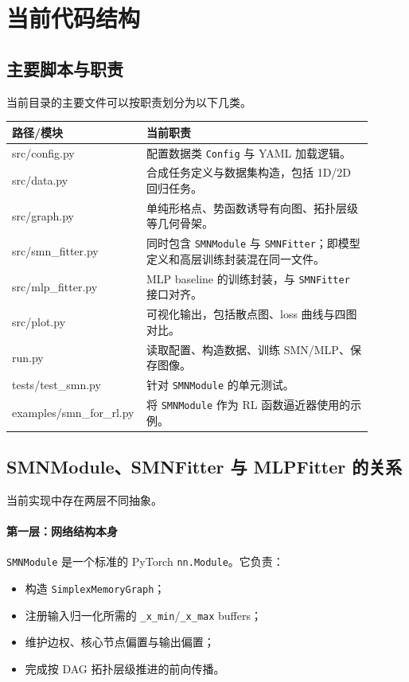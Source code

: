 \documentclass[11pt,fontset=none]{ctexart}
\begin{document}
\section{当前代码结构}

\subsection{主要脚本与职责}

当前目录的主要文件可以按职责划分为以下几类。

\begin{center}
\begin{tabular}{>{\ttfamily}p{0.28\linewidth} p{0.62\linewidth}}
\toprule
路径/模块 & 当前职责 \\
\midrule
src/config.py & 配置数据类 \texttt{Config} 与 YAML 加载逻辑。 \\
src/data.py & 合成任务定义与数据集构造，包括 1D/2D 回归任务。 \\
src/graph.py & 单纯形格点、势函数诱导有向图、拓扑层级等几何骨架。 \\
src/smn\_fitter.py & 同时包含 \texttt{SMNModule} 与 \texttt{SMNFitter}；即模型定义和高层训练封装混在同一文件。 \\
src/mlp\_fitter.py & MLP baseline 的训练封装，与 \texttt{SMNFitter} 接口对齐。 \\
src/plot.py & 可视化输出，包括散点图、loss 曲线与四图对比。 \\
run.py & 读取配置、构造数据、训练 SMN/MLP、保存图像。 \\
tests/test\_smn.py & 针对 \texttt{SMNModule} 的单元测试。 \\
examples/smn\_for\_rl.py & 将 \texttt{SMNModule} 作为 RL 函数逼近器使用的示例。 \\
\bottomrule
\end{tabular}
\end{center}

\subsection{SMNModule、SMNFitter 与 MLPFitter 的关系}

当前实现中存在两层不同抽象。

\paragraph{第一层：网络结构本身}
\texttt{SMNModule} 是一个标准的 PyTorch \texttt{nn.Module}。它负责：
\begin{itemize}[leftmargin=2em]
  \item 构造 \texttt{SimplexMemoryGraph}；
  \item 注册输入归一化所需的 \texttt{\_x\_min}/\texttt{\_x\_max} buffers；
  \item 维护边权、核心节点偏置与输出偏置；
  \item 完成按 DAG 拓扑层级推进的前向传播。
\end{itemize}
\end{document}
